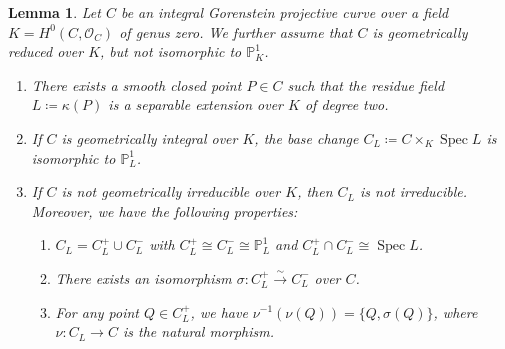 \documentclass[12pt]{amsart}
\def\Spec{\operatorname{Spec}}
\newcommand{\PP}{\mathbb{P}}
\newcommand{\sO}{\mathcal{O}}
\theoremstyle{plain}
\newtheorem{lem}[thm]{Lemma}
\theoremstyle{definition}
\theoremstyle{remark}
\newtheorem{defn and notation}[thm]{Definition and Notation}
\theoremstyle{plain}
\numberwithin{equation}{thm}
\begin{document}
\begin{lem}\label{lem:genus zero curve}
Let $C$ be an integral Gorenstein projective curve over a field $K=H^0(C,\sO_C)$ of genus zero.
We further assume that $C$ is geometrically reduced over $K$, but not isomorphic to $\PP^1_K$.
\begin{enumerate}[label=\textup{(\arabic*)}]
    \item There exists a smooth closed point $P \in C$ such that the residue field $L \coloneqq \kappa(P)$ is a separable extension over $K$ of degree two.
    \item If $C$ is geometrically integral over $K$, the base change $C_L \coloneqq C \times_K \Spec L$ is isomorphic to $\PP^1_L$.
    \item If $C$ is not geometrically irreducible over $K$, then $C_L$ is not irreducible.
    Moreover, we have the following properties:
    \begin{enumerate}[label=\textup{(\roman*)}]
    \item $C_L = C_L^+ \cup C_L^-$ with $C_L^+ \cong C_L^- \cong \PP^1_L$ and $C_L^+ \cap C_L^- \cong \Spec L$.
    \item There exists an isomorphism $\sigma: C_L^+ \xrightarrow{\sim} C_L^-$ over $C$.
    \item For any point $Q \in C_L^+$, we have $\nu^{-1}(\nu(Q))=\{Q, \sigma(Q)\}$, where $\nu: C_L \to C$ is the natural morphism.
    \end{enumerate}
\end{enumerate}
\end{lem}
\end{document}
